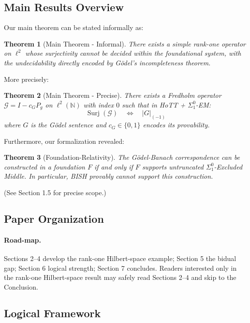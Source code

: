 \documentclass[11pt]{article}
\newtheorem{theorem}{Theorem}[section]
\theoremstyle{definition}
\newcommand{\N}{\mathbb{N}}
\newcommand{\lp}{\ell^{2}(\N)}
\newcommand{\SigOne}{\Sigma^{0}_{\!1}}
\DeclareMathOperator{\Surj}{Surj}
\newcommand{\trunc}[1]{\lvert #1\rvert_{(-1)}}
\begin{document}
\subsection{Main Results Overview}

Our main theorem can be stated informally as:

\begin{theorem}[Main Theorem - Informal]\label{thm:main_informal}
There exists a simple rank-one operator on $\ell^2$ whose surjectivity cannot be decided within the foundational system, with the undecidability directly encoded by Gödel's incompleteness theorem.
\end{theorem}

More precisely:

\begin{theorem}[Main Theorem - Precise]\label{thm:main_precise}
There exists a Fredholm operator $\mathcal{G} = I - c_G P_g$ on $\lp$ with 
index $0$ such that in HoTT + $\SigOne$-EM:
\[
\Surj(\mathcal{G}) \quad\Longleftrightarrow\quad \trunc{G}
\]
where $G$ is the Gödel sentence and $c_G \in \{0,1\}$ encodes its provability.
\end{theorem}

Furthermore, our formalization revealed:

\begin{theorem}[Foundation-Relativity]\label{thm:foundation_relative_intro}
The Gödel-Banach correspondence can be constructed in a foundation $F$ if and only if $F$ supports untruncated $\SigOne$-Excluded Middle. In particular, BISH provably cannot support this construction.
\end{theorem}

(See Section 1.5 for precise scope.)

\subsection{Paper Organization}
\paragraph{Road-map.}
Sections 2--4 develop the rank-one Hilbert-space example; Section 5 the bidual gap; Section 6 logical strength; Section 7 concludes. Readers interested only in the rank-one Hilbert-space result may safely read Sections 2--4 and skip to the Conclusion.

\subsection{Logical Framework}
\end{document}
